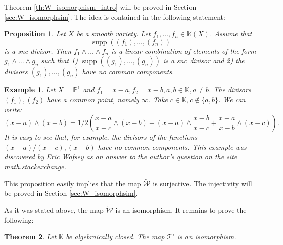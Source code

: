\documentclass[12pt]{extarticle}
\newtheorem{theorem}{Theorem}[section]
\newtheorem*{example}{Example}
\newtheorem{proposition}[theorem]{Proposition}
\newtheorem{remark}[theorem]{Remark}
\def\mb{\mathbb}
\def\mc{\mathcal}
\def\L{\Lambda}
\def\k{\mb K}
\def\wt{\widetilde}
\renewcommand{\P}{{\mb P}}
\def\wdw{\wedge\dots\wedge}
\def\T{\mc T}
\def\W{\mc W}
\def \tW{\wt{\W}}
\def \wW{\tW}
\def \wL{\L_{\geq m-1}}
\DeclareMathOperator{\supp}{supp}
\begin{document}
Theorem \ref{th:W_isomorphism_intro} will be proved in Section \ref{sec:W_isomorphsim}. The idea is contained in the following statement:

\begin{proposition}
\label{pr:weakly_adm_is_str_adm_intro}
    Let $X$ be a smooth variety. Let $f_1,\dots, f_n\in\k(X)$. Assume that $$\supp((f_1),\dots, (f_n))$$ is a snc divisor. Then $f_1\wdw f_n$ is a linear combination of elements of the form $g_1\wdw g_n$ such that 1) $\supp((g_1),\dots, (g_n))$ is a snc divisor and 2) the divisors $(g_1),\dots, (g_n)$ have no common components.
\end{proposition}

\begin{example}
    Let $X=\P^1$ and $f_1=x-a, f_2=x-b, a,b\in \k, a\ne b$. The divisors $(f_1), (f_2)$ have a common point, namely $\infty$. Take $c\in \k, c\not\in\{a,b\}$. We can write:
    $$(x-a)\wedge (x-b)=1/2\left(\dfrac{x-a}{x-c}\wedge (x-b)+(x-a)\wedge \dfrac{x-b}{x-c}+\dfrac{x-a}{x-b}\wedge (x-c)\right).$$
    It is easy to see that, for example, the divisors of the functions $(x-a)/(x-c), (x-b)$ have no common components. This example was discovered by Eric Wofsey \cite{4728781} as an answer to the author's question on the site math.stackexchange. 
\end{example}

This proposition easily implies that the map $\wW$ is surjective. The injectivity will be proved in Section \ref{sec:W_isomorphsim}.


As it was stated above, the map $\tW$ is an isomorphism. It remains to prove the following: 

\begin{theorem}
\label{th:Totaro_isomorphism_intro}
    Let $\k$ be algebraically closed. The map $\T'$ is an isomorphism.
\end{theorem}

\end{document}
